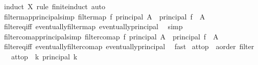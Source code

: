 \begin{isabellebody}
%
\isatagproof
{}\isamarkupfalse%
\ {\isacharparenleft}{\kern0pt}induct\ X\ rule{\isacharcolon}{\kern0pt}\ finite{\isacharunderscore}{\kern0pt}induct{\isacharparenright}{\kern0pt}\ auto%
\endisatagproof
{\isafoldproof}%
%
\isadelimproof
\isanewline
%
\endisadelimproof
\isanewline
{}\isamarkupfalse%
\ filtermap{\isacharunderscore}{\kern0pt}principal{\isacharbrackleft}{\kern0pt}simp{\isacharbrackright}{\kern0pt}{\isacharcolon}{\kern0pt}\ {\isachardoublequoteopen}filtermap\ f\ {\isacharparenleft}{\kern0pt}principal\ A{\isacharparenright}{\kern0pt}\ {\isacharequal}{\kern0pt}\ principal\ {\isacharparenleft}{\kern0pt}f\ {\isacharbackquote}{\kern0pt}\ A{\isacharparenright}{\kern0pt}{\isachardoublequoteclose}\isanewline
%
\isadelimproof
\ \ %
\endisadelimproof
%
\isatagproof
{}\isamarkupfalse%
\ filter{\isacharunderscore}{\kern0pt}eq{\isacharunderscore}{\kern0pt}iff\ eventually{\isacharunderscore}{\kern0pt}filtermap\ eventually{\isacharunderscore}{\kern0pt}principal\ \isamarkupfalse%
\ simp%
\endisatagproof
{\isafoldproof}%
%
\isadelimproof
\isanewline
%
\endisadelimproof
\ \ \ \ \isanewline
{}\isamarkupfalse%
\ filtercomap{\isacharunderscore}{\kern0pt}principal{\isacharbrackleft}{\kern0pt}simp{\isacharbrackright}{\kern0pt}{\isacharcolon}{\kern0pt}\ {\isachardoublequoteopen}filtercomap\ f\ {\isacharparenleft}{\kern0pt}principal\ A{\isacharparenright}{\kern0pt}\ {\isacharequal}{\kern0pt}\ principal\ {\isacharparenleft}{\kern0pt}f\ {\isacharminus}{\kern0pt}{\isacharbackquote}{\kern0pt}\ A{\isacharparenright}{\kern0pt}{\isachardoublequoteclose}\isanewline
%
\isadelimproof
\ \ %
\endisadelimproof
%
\isatagproof
{}\isamarkupfalse%
\ filter{\isacharunderscore}{\kern0pt}eq{\isacharunderscore}{\kern0pt}iff\ eventually{\isacharunderscore}{\kern0pt}filtercomap\ eventually{\isacharunderscore}{\kern0pt}principal\ \isamarkupfalse%
\ fast%
\endisatagproof
{\isafoldproof}%
%
\isadelimproof
%
\endisadelimproof
%
\isadelimdocument
%
\endisadelimdocument
%
\isatagdocument
%
\isamarkuptrue%
%
\endisatagdocument
{\isafolddocument}%
%
\isadelimdocument
%
\endisadelimdocument
{}\isamarkupfalse%
\ at{\isacharunderscore}{\kern0pt}top\ {\isacharcolon}{\kern0pt}{\isacharcolon}{\kern0pt}\ {\isachardoublequoteopen}{\isacharparenleft}{\kern0pt}{\isacharprime}{\kern0pt}a{\isacharcolon}{\kern0pt}{\isacharcolon}{\kern0pt}order{\isacharparenright}{\kern0pt}\ filter{\isachardoublequoteclose}\isanewline
\ \ \ {\isachardoublequoteopen}at{\isacharunderscore}{\kern0pt}top\ {\isacharequal}{\kern0pt}\ {\isacharparenleft}{\kern0pt}{\isasymSqinter}k{\isachardot}{\kern0pt}\ principal\ {\isacharbraceleft}{\kern0pt}k\ {\isachardot}{\kern0pt}{\isachardot}{\kern0pt}{\isacharbraceright}{\kern0pt}{\isacharparenright}{\kern0pt}{\isachardoublequoteclose}\isanewline

\end{isabellebody}
